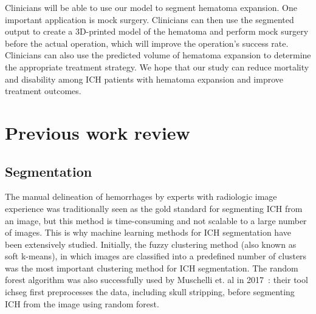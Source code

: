 \documentclass[11pt, journal, a4paper]{IEEEtran}
\begin{document}
Clinicians will be able to use our model to segment hematoma expansion. One important application is mock surgery. Clinicians can then use the segmented output to create a 3D-printed model of the hematoma and perform mock surgery before the actual operation, which will improve the operation's success rate. Clinicians can also use the predicted volume of hematoma expansion to determine the appropriate treatment strategy. We hope that our study can reduce mortality and disability among ICH patients with hematoma expansion and improve treatment outcomes.






\section{Previous work review}
\subsection{Segmentation}
The manual delineation of hemorrhages by experts with radiologic image experience was traditionally seen as the gold standard for segmenting ICH from an image, but this method is time-consuming and not scalable to a large number of images. This is why machine learning methods for ICH segmentation have been extensively studied. Initially, the fuzzy clustering method (also known as soft k-means), in which images are classified into a predefined number of clusters \cite{fuzzy_cluster} was the most important clustering method for ICH segmentation. The random forest algorithm was also successfully used by Muschelli et. al in 2017~\cite{pitchperfect}: their tool ichseg first preprocesses the data, including skull stripping, before segmenting ICH from the image using random forest.
\end{document}
